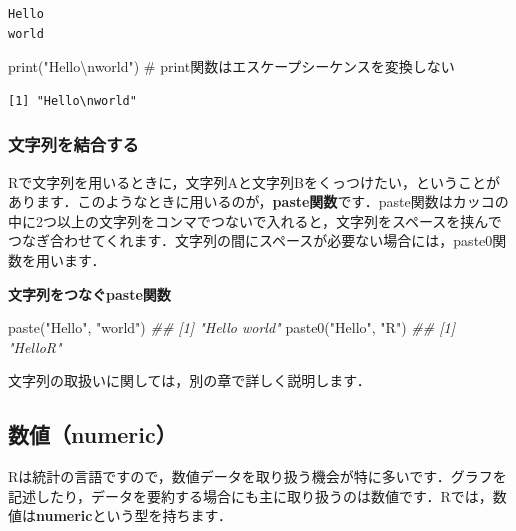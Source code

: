 \documentclass[
  letterpaper,
  DIV=11,
  numbers=noendperiod]{scrreprt}
\newenvironment{Shaded}{\begin{snugshade}}{\end{snugshade}}
\newcommand{\CommentTok}[1]{\textcolor[rgb]{0.37,0.37,0.37}{#1}}
\newcommand{\DocumentationTok}[1]{\textcolor[rgb]{0.37,0.37,0.37}{\textit{#1}}}
\newcommand{\FunctionTok}[1]{\textcolor[rgb]{0.28,0.35,0.67}{#1}}
\newcommand{\NormalTok}[1]{\textcolor[rgb]{0.00,0.23,0.31}{#1}}
\newcommand{\SpecialCharTok}[1]{\textcolor[rgb]{0.37,0.37,0.37}{#1}}
\newcommand{\StringTok}[1]{\textcolor[rgb]{0.13,0.47,0.30}{#1}}
\begin{document}
\begin{verbatim}
Hello
world
\end{verbatim}

\begin{Shaded}
\begin{Highlighting}[]
\FunctionTok{print}\NormalTok{(}\StringTok{"Hello}\SpecialCharTok{\textbackslash{}n}\StringTok{world"}\NormalTok{) }\CommentTok{\# print関数はエスケープシーケンスを変換しない}
\end{Highlighting}
\end{Shaded}

\begin{verbatim}
[1] "Hello\nworld"
\end{verbatim}

\hypertarget{ux6587ux5b57ux5217ux3092ux7d50ux5408ux3059ux308b}{%
\subsubsection{文字列を結合する}\label{ux6587ux5b57ux5217ux3092ux7d50ux5408ux3059ux308b}}

Rで文字列を用いるときに，文字列Aと文字列Bをくっつけたい，ということがあります．このようなときに用いるのが，\textbf{paste関数}です．paste関数はカッコの中に2つ以上の文字列をコンマでつないで入れると，文字列をスペースを挟んでつなぎ合わせてくれます．文字列の間にスペースが必要ない場合には，paste0関数を用います．

\textbf{文字列をつなぐpaste関数}

\begin{Shaded}
\begin{Highlighting}[]
\FunctionTok{paste}\NormalTok{(}\StringTok{"Hello"}\NormalTok{, }\StringTok{"world"}\NormalTok{)}
\DocumentationTok{\#\# [1] "Hello world"}
\FunctionTok{paste0}\NormalTok{(}\StringTok{"Hello"}\NormalTok{, }\StringTok{"R"}\NormalTok{)}
\DocumentationTok{\#\# [1] "HelloR"}
\end{Highlighting}
\end{Shaded}

文字列の取扱いに関しては，別の章で詳しく説明します．

\hypertarget{ux6570ux5024numeric}{%
\subsection{数値（numeric）}\label{ux6570ux5024numeric}}

Rは統計の言語ですので，数値データを取り扱う機会が特に多いです．グラフを記述したり，データを要約する場合にも主に取り扱うのは数値です．Rでは，数値は\textbf{numeric}という型を持ちます．
\end{document}
